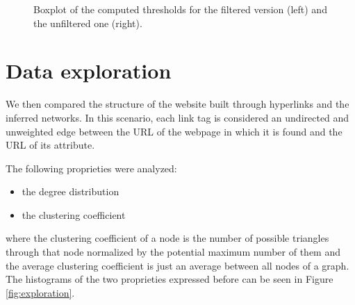 \begin{figure}[ht]
    \centering
    \caption{Boxplot of the computed thresholds for the filtered version (left) and the unfiltered one (right).}
    \label{fig:threshold-box}
\end{figure}

\section{Data exploration}
We then compared the structure of the website built through hyperlinks and the inferred networks. 
In this scenario, each link tag is considered an undirected and unweighted edge 
between the URL of the webpage in which it is found and the URL of its  attribute.

The following proprieties were analyzed:
\begin{itemize}
    \item the degree distribution
    \item the clustering coefficient
\end{itemize}
where the clustering coefficient of a node is the number of possible triangles through that node normalized 
by the potential maximum number of them 
and the average clustering coefficient is just an average between all nodes of a graph.
The histograms of the two proprieties expressed before can be seen in Figure \ref{fig:exploration}. 

